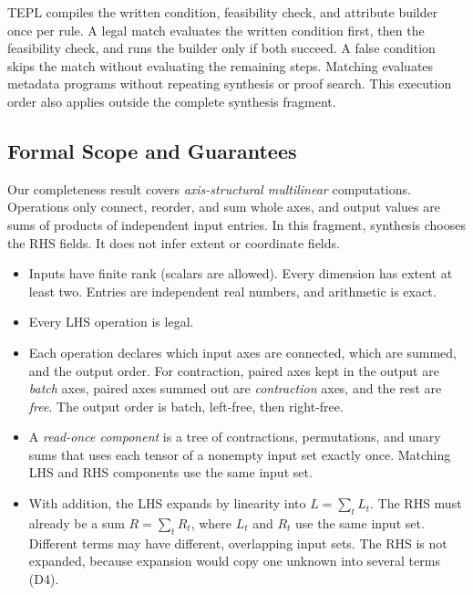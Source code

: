 TEPL compiles the written condition, feasibility check, and attribute
builder once per rule. A legal match evaluates the written condition first,
then the feasibility check, and runs the builder only if both succeed.
A false condition skips the match without evaluating the remaining steps.
Matching evaluates metadata programs without repeating synthesis or proof
search. This execution order also applies outside the complete synthesis
fragment.

\subsection{Formal Scope and Guarantees}
\label{sec:formal-scope-and-guarantees}
Our completeness result covers \emph{axis-structural multilinear}
computations. Operations only connect, reorder, and sum whole axes, and
output values are sums of products of independent input entries. In this
fragment, synthesis chooses the RHS  fields. It does not infer
extent or coordinate fields.

\begin{itemize}
\item Inputs have finite rank (scalars are allowed). Every dimension has
extent at least two. Entries are independent real numbers, and arithmetic
is exact.
\item Every LHS operation is legal.
\item Each operation declares which input axes are connected, which are
summed, and the output order. For contraction, paired axes kept in the
output are \emph{batch} axes, paired axes summed out are \emph{contraction}
axes, and the rest are \emph{free}. The output order is batch, left-free,
then right-free.
\item A \emph{read-once component} is a tree of contractions, permutations,
and unary sums that uses each tensor of a nonempty input set exactly once.
Matching LHS and RHS components use the same input set.
\item With addition, the LHS expands by linearity into $L=\sum_t L_t$. The
RHS must already be a sum $R=\sum_t R_t$, where $L_t$ and $R_t$ use the same
input set. Different terms may have different, overlapping input sets. The
RHS is not expanded, because expansion would copy one unknown into several
terms (D4).
\end{itemize}

